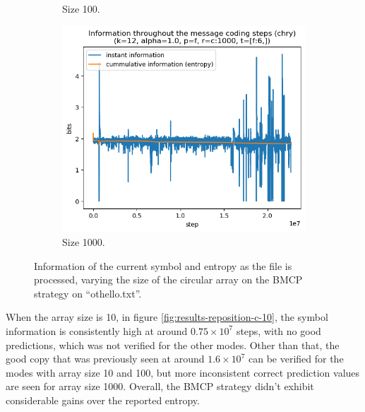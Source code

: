 \documentclass{article}
\begin{document}
\begin{figure}
\begin{subfigure}[b]{0.3\textwidth}
\begin{center}
        \end{center}
        \caption{Size 100.}
        \label{fig:results-reposition-c-100}
    \end{subfigure}
    \hfill
    \begin{subfigure}[b]{0.3\textwidth}
        \begin{center}
            \includegraphics[width=1.0\linewidth]{../scripts/images/chry_12_1.0_f_c:1000_[f:6,].png}
        \end{center}
        \caption{Size 1000.}
        \label{fig:results-reposition-c-1000}
    \end{subfigure}
    \caption{Information of the current symbol and entropy as the file is processed, varying the size of the circular array on the BMCP strategy on ``othello.txt''.}
    \label{fig:results-reposition-c}
\end{figure}

When the array size is 10, in figure \ref{fig:results-reposition-c-10}, the symbol information is consistently high at around $0.75\times10^7$ steps, with no good predictions, which was not verified for the other modes.
Other than that, the good copy that was previously seen at around $1.6\times10^7$ can be verified for the modes with array size 10 and 100, but more inconsistent correct prediction values are seen for array size 1000.
Overall, the BMCP strategy didn't exhibit considerable gains over the reported entropy.
\end{document}
